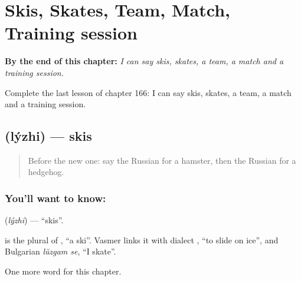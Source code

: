 
\chapter{Skis, Skates, Team, Match, Training session}
\label{ch:ru-skis-skates-team-match-training-session}

\begin{chapteropening}
\textbf{By the end of this chapter:} \emph{I can say skis, skates, a team, a match and a training session.}

Complete the last lesson of chapter 166: I can say skis, skates, a team, a match and a training session.
\end{chapteropening}

\section[\texorpdfstring{\ru{лыжи} (lýzhi)}{лыжи (lýzhi)}]{ (lýzhi) — skis}

\label{lesson:RU-C166-lyzhi}



\begin{quote}
Before the new one: say the Russian for a hamster, then the Russian for a hedgehog.
\end{quote}

\subsection*{You'll want to know: }
\textbf{} (\emph{lýzhi}) — \textquotedblleft{}skis\textquotedblright{}.

\begin{cousinweb}
\textbf{} is the plural of \emph{}, \textquotedblleft{}a ski\textquotedblright{}. Vasmer links it with dialect \emph{}, \textquotedblleft{}to slide on ice\textquotedblright{}, and Bulgarian \emph{lŭzgam se}, \textquotedblleft{}I skate\textquotedblright{}.
\end{cousinweb}

\begin{grammarlens}[title={What you've built}]
One more word for this chapter.
\end{grammarlens}

